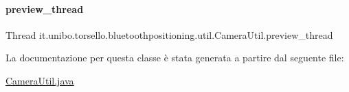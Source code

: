 \paragraph{\texorpdfstring{preview\+\_\+thread}{preview\_thread}}
{\footnotesize\ttfamily Thread it.\+unibo.\+torsello.\+bluetoothpositioning.\+util.\+Camera\+Util.\+preview\+\_\+thread\hspace{0.3cm}{\ttfamily [private]}}



La documentazione per questa classe è stata generata a partire dal seguente file\+:\begin{DoxyCompactItemize}
\item 
\hyperlink{CameraUtil_8java}{Camera\+Util.\+java}\end{DoxyCompactItemize}
